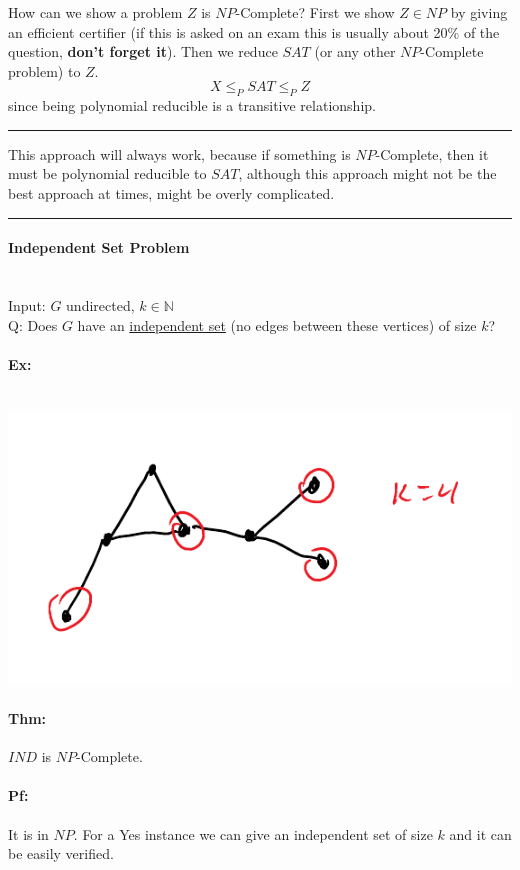 \documentclass[12 pt]{article}
\begin{document}
          How can we show a problem $Z$ is $NP$-Complete? First we
          show $Z \in NP$ by giving an efficient certifier (if this is
          asked on an exam this is usually about 20\% of the question,
          \textbf{don't forget it}). Then we reduce $SAT$ (or any
          other $NP$-Complete problem) to $Z$.
          $$X \leq_P SAT \leq_P Z$$ since being polynomial reducible
          is a transitive relationship.
          \\ \noindent \rule{\textwidth}{0.5pt}
          This approach will always work, because if something is
          $NP$-Complete, then it must be polynomial reducible to
          $SAT$, although this approach might not be the best approach
          at times, might be overly complicated.
          \\ \noindent \rule{\textwidth}{0.5pt}
          \paragraph{Independent Set Problem}~
          \\Input: $G$ undirected, $k\in \mathbb{N}$
          \\ Q: Does $G$ have an \underline{independent set} (no edges
          between these vertices) of size $k$?
          \paragraph{Ex:} ~
          \\\includegraphics[width=.9\textwidth]{i125.pdf}
          \paragraph{Thm:} $IND$ is $NP$-Complete.
          \paragraph{Pf:} It is in $NP$. For a Yes instance we can
          give an independent set of size $k$ and it can be easily
          verified.
\end{document}
